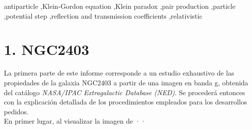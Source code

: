 \documentclass[final,5p,times,twocolumn, nopreprintline]{elsarticle}
\numberwithin{equation}{section}
\begin{document}
\begin{frontmatter}
\begin{keyword}
antiparticle \sep Klein-Gordon equation \sep Klein paradox \sep pair production \sep particle \sep potential step \sep reflection and transmission coefficients \sep relativistic


\end{keyword}


\end{frontmatter}




\section{1. NGC2403}

La primera parte de este informe corresponde a un estudio exhaustivo de las propiedades de la galaxia NGC2403 a partir de una imagen en banda g, obtenida del catálogo \emph{NASA/IPAC Extragalactic Database (NED)}. Se procederá entonces con la explicación detallada de los procedimientos empleados para los desarrollos pedidos.\\

En primer lugar, al visualizar la imagen de ··

 







\end{document}

